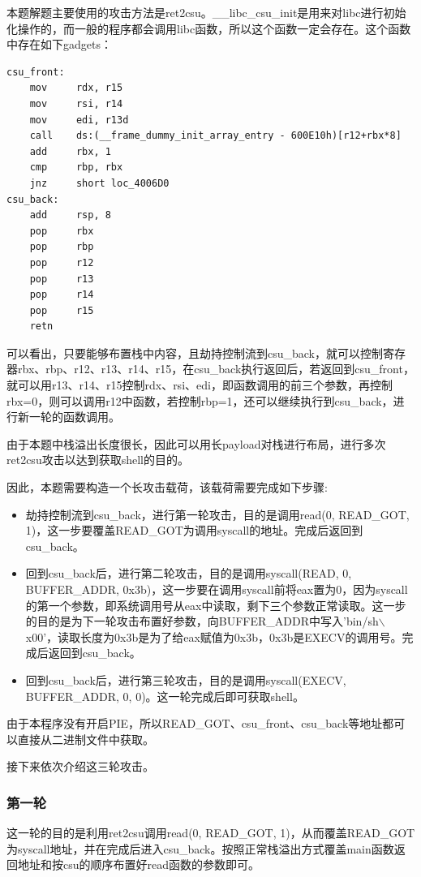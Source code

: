 本题解题主要使用的攻击方法是ret2csu。\_\_libc\_csu\_init是用来对libc进行初始化操作的，而一般的程序都会调用libc函数，所以这个函数一定会存在。这个函数中存在如下gadgets：
\begin{lstlisting}
csu_front:
    mov     rdx, r15
    mov     rsi, r14
    mov     edi, r13d
    call    ds:(__frame_dummy_init_array_entry - 600E10h)[r12+rbx*8]
    add     rbx, 1
    cmp     rbp, rbx
    jnz     short loc_4006D0
csu_back:
    add     rsp, 8
    pop     rbx
    pop     rbp
    pop     r12
    pop     r13
    pop     r14
    pop     r15
    retn
\end{lstlisting}
可以看出，只要能够布置栈中内容，且劫持控制流到csu\_back，就可以控制寄存器rbx、rbp、r12、r13、r14、r15，在csu\_back执行返回后，若返回到csu\_front，就可以用r13、r14、r15控制rdx、rsi、edi，即函数调用的前三个参数，再控制rbx=0，则可以调用r12中函数，若控制rbp=1，还可以继续执行到csu\_back，进行新一轮的函数调用。

由于本题中栈溢出长度很长，因此可以用长payload对栈进行布局，进行多次ret2csu攻击以达到获取shell的目的。

因此，本题需要构造一个长攻击载荷，该载荷需要完成如下步骤:
\begin{itemize}
    \item 劫持控制流到csu\_back，进行第一轮攻击，目的是调用read(0, READ\_GOT, 1)，这一步要覆盖READ\_GOT为调用syscall的地址。完成后返回到csu\_back。
    \item 回到csu\_back后，进行第二轮攻击，目的是调用syscall(READ, 0, BUFFER\_ADDR, 0x3b)，这一步要在调用syscall前将eax置为0，因为syscall的第一个参数，即系统调用号从eax中读取，剩下三个参数正常读取。这一步的目的是为下一轮攻击布置好参数，向BUFFER\_ADDR中写入'bin/sh$\backslash$x00'，读取长度为0x3b是为了给eax赋值为0x3b，0x3b是EXECV的调用号。完成后返回到csu\_back。
    \item 回到csu\_back后，进行第三轮攻击，目的是调用syscall(EXECV, BUFFER\_ADDR, 0, 0)。这一轮完成后即可获取shell。
\end{itemize}

由于本程序没有开启PIE，所以READ\_GOT、csu\_front、csu\_back等地址都可以直接从二进制文件中获取。

接下来依次介绍这三轮攻击。

\subsubsection*{第一轮}
这一轮的目的是利用ret2csu调用read(0, READ\_GOT, 1)，从而覆盖READ\_GOT为syscall地址，并在完成后进入csu\_back。按照正常栈溢出方式覆盖main函数返回地址和按csu的顺序布置好read函数的参数即可。

